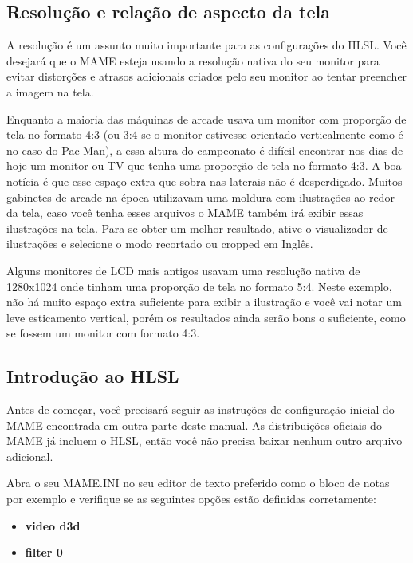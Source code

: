 \documentclass[letterpaper,10pt,brazil]{sphinxmanual}
\begin{document}
\subsection{Resolução e relação de aspecto da tela}
\label{advanced/hlsl:resolucao-e-relacao-de-aspecto-da-tela}
A resolução é um assunto muito importante para as configurações do HLSL.
Você desejará que o MAME esteja usando a resolução nativa do seu monitor
para evitar distorções e atrasos adicionais criados pelo seu monitor ao
tentar preencher a imagem na tela.

Enquanto a maioria das máquinas de arcade usava um monitor com proporção
de tela no formato 4:3 (ou 3:4 se o monitor estivesse orientado
verticalmente como é no caso do Pac Man), a essa altura do campeonato é
difícil encontrar nos dias de hoje um monitor ou TV que tenha uma
proporção de tela no formato 4:3. A boa notícia é que esse espaço extra
que sobra nas laterais não é desperdiçado. Muitos gabinetes de arcade na
época utilizavam uma moldura com ilustrações ao redor da tela, caso você
tenha esses arquivos o MAME também irá exibir essas ilustrações na tela.
Para se obter um melhor resultado, ative o visualizador de ilustrações e
selecione o modo recortado ou cropped em Inglês.

Alguns monitores de LCD mais antigos usavam uma resolução nativa de
1280x1024 onde tinham uma proporção de tela no formato 5:4.
Neste exemplo, não há muito espaço extra suficiente para exibir a
ilustração e você vai notar um leve esticamento vertical, porém os
resultados ainda serão bons o suficiente, como se fossem um monitor com
formato 4:3.


\subsection{Introdução ao HLSL}
\label{advanced/hlsl:introducao-ao-hlsl}
Antes de começar, você precisará seguir as instruções de configuração
inicial do MAME encontrada em outra parte deste manual.
As distribuições oficiais do MAME já incluem o HLSL, então você não
precisa baixar nenhum outro arquivo adicional.

Abra o seu MAME.INI no seu editor de texto preferido como o bloco de
notas por exemplo e verifique se as seguintes opções estão definidas
corretamente:
\begin{itemize}
\item {} 
\textbf{video d3d}

\item {} 
\textbf{filter 0}

\end{itemize}
\end{document}
